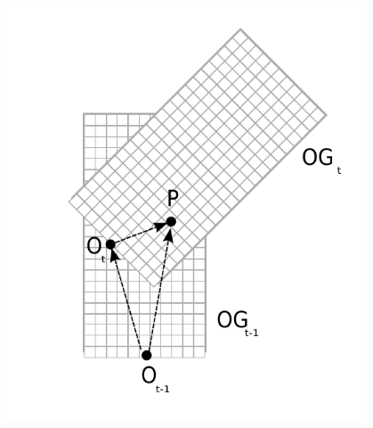 \documentclass{beamer}
\begin{document}
\begin{frame}
\begin{columns}[t]
\begin{column}{5cm}
		  \end{column}
		  \begin{column}{5cm}
			\begin{figure}[h]
			\center
			\includegraphics[scale=0.6]{../img/fig:translation}
			\end{figure}	
		  \end{column}
		 \end{columns}		 

	\end{frame}
\end{document}
